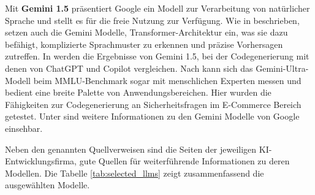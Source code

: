 Mit \textbf{Gemini 1.5} präsentiert Google ein Modell zur Verarbeitung von natürlicher Sprache und stellt es für die freie Nutzung zur Verfügung. Wie in \cite{siam-2024} beschrieben, setzen auch die Gemini Modelle, Transformer-Architektur ein, was sie dazu befähigt, komplizierte Sprachmuster zu erkennen und präzise Vorhersagen zutreffen. In \cite{siam-2024} werden die Ergebnisse von Gemini 1.5, bei der Codegenerierung mit denen von ChatGPT und Copilot vergleichen. Nach \cite{elgedawy-2024} kann sich das Gemini-Ultra-Modell beim MMLU-Benchmark sogar mit menschlichen Experten messen und bedient eine breite Palette von Anwendungsbereichen. Hier wurden die Fähigkeiten zur Codegenerierung an Sicherheitsfragen im E-Commerce Bereich getestet. Unter \cite{google_gemini_model_overview} sind weitere Informationen zu den Gemini Modelle von Google einsehbar.\vspace{0.2cm}

Neben den genannten Quellverweisen sind die Seiten der jeweiligen KI-Entwicklungsfirma, gute Quellen für weiterführende Informationen zu deren Modellen. Die Tabelle \ref{tab:selected_llms} zeigt zusammenfassend die ausgewählten Modelle.\vspace{0.2cm}


